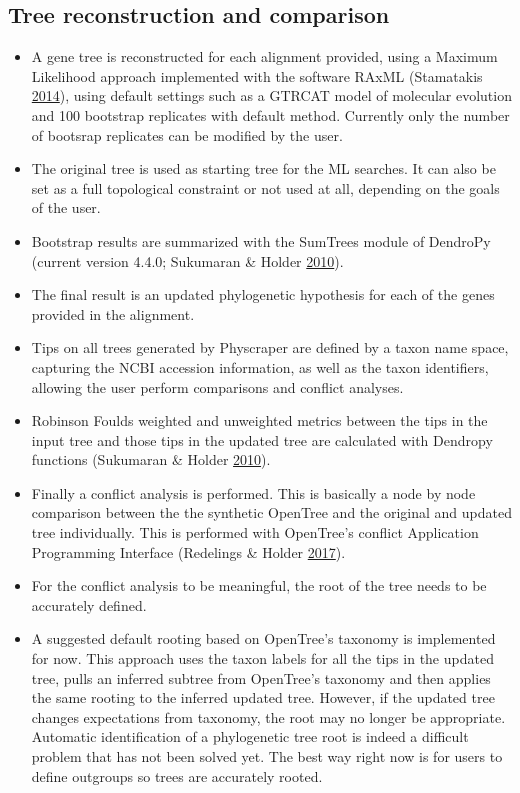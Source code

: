 \documentclass[]{article}
\providecommand{\tightlist}{%
  \setlength{\itemsep}{0pt}\setlength{\parskip}{0pt}}
\begin{document}
\hypertarget{tree-reconstruction-and-comparison}{%
\subsection{Tree reconstruction and comparison}\label{tree-reconstruction-and-comparison}}

\begin{itemize}
\tightlist
\item
  A gene tree is reconstructed for each alignment provided, using a Maximum Likelihood approach implemented with the software RAxML (Stamatakis \protect\hyperlink{ref-stamatakis2014raxml}{2014}), using default settings such as a GTRCAT model of molecular evolution and 100 bootstrap replicates with default method. Currently only the number of bootsrap replicates can be modified by the user.
\item
  The original tree is used as starting tree for the ML searches. It can also be set as a full topological constraint or not used at all, depending on the goals of the user.
\item
  Bootstrap results are summarized with the SumTrees module of DendroPy (current version 4.4.0; Sukumaran \& Holder \protect\hyperlink{ref-sukumaran2010dendropy}{2010}).
\item
  The final result is an updated phylogenetic hypothesis for each of the genes provided in the alignment.
\item
  Tips on all trees generated by Physcraper are defined by a taxon name space, capturing the NCBI accession information, as well as the taxon identifiers, allowing the user perform comparisons and conflict analyses.
\item
  Robinson Foulds weighted and unweighted metrics between the tips in the input tree and those tips in the updated tree are calculated with Dendropy functions (Sukumaran \& Holder \protect\hyperlink{ref-sukumaran2010dendropy}{2010}).
\item
  Finally a conflict analysis is performed. This is basically a node by node comparison between the the synthetic OpenTree and the original and updated tree individually. This is performed with OpenTree's conflict Application Programming Interface (Redelings \& Holder \protect\hyperlink{ref-redelings2017supertree}{2017}).
\item
  For the conflict analysis to be meaningful, the root of the tree needs to be accurately defined.
\item
  A suggested default rooting based on OpenTree's taxonomy is implemented for now. This approach uses the taxon labels for all the tips in the updated tree, pulls an inferred subtree from OpenTree's taxonomy and then applies the same rooting to the inferred updated tree. However, if the updated tree changes expectations from taxonomy, the root may no longer be appropriate. Automatic identification of a phylogenetic tree root is indeed a difficult problem that has not been solved yet. The best way right now is for users to define outgroups so trees are accurately rooted.
\end{itemize}
\end{document}
